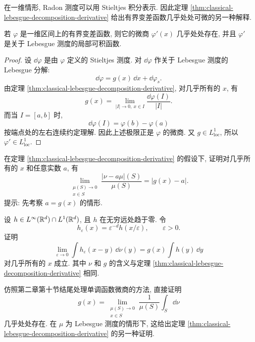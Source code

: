 在一维情形, Radon 测度可以用 Stieltjes 积分表示. 因此定理 \ref{thm:classical-lebesgue-decomposition-derivative} 给出有界变差函数几乎处处可微的另一种解释.

\begin{thm}\label{thm:bv-function-ae-derivative-from-decomposition}
	若 \(\varphi\) 是一维区间上的有界变差函数, 则它的微商 \(\varphi'(x)\) 几乎处处存在, 并且 \(\varphi'\) 是关于 Lebesgue 测度的局部可积函数.
\end{thm}

\begin{proof}
	设 \(\dd\varphi\) 是由 \(\varphi\) 定义的 Stieltjes 测度. 对 \(\dd\varphi\) 作关于 Lebesgue 测度的 Lebesgue 分解:
	\[
	\dd\varphi=g(x)\,\dd x+\dd\varphi_s.
	\]
	由定理 \ref{thm:classical-lebesgue-decomposition-derivative}, 对几乎所有的 \(x\), 有
	\[
	g(x)=
	\lim_{|I|\to0,\ x\in I}
	\frac{\dd\varphi(I)}{|I|}.
	\]
	而当 \(I=[a,b]\) 时,
	\[
	\dd\varphi(I)=\varphi(b)-\varphi(a)
	\]
	按端点处的左右连续约定理解. 因此上述极限正是 \(\varphi\) 的微商. 又 \(g\in L^1_{\operatorname{loc}}\), 所以 \(\varphi'\in L^1_{\operatorname{loc}}\).
\end{proof}

\begin{exer}\label{exer:classical-decomposition-total-variation-derivative}
	在定理 \ref{thm:classical-lebesgue-decomposition-derivative} 的假设下, 证明对几乎所有的 \(x\) 和任意实数 \(a\), 有
	\[
	\lim_{\substack{\mu(S)\to0\\x\in S}}
	\frac{|\nu-a\mu|(S)}{\mu(S)}
	=
	|g(x)-a|.
	\]
	提示: 先考察 \(a=g(x)\) 的情形.
\end{exer}

\begin{exer}\label{exer:approximate-identity-measure-density}
	设 \(h\in L^\infty(\mathbb{R}^d)\cap L^1(\mathbb{R}^d)\), 且 \(h\) 在无穷远处趋于零. 令
	\[
	h_\varepsilon(x)=\varepsilon^{-d}h(x/\varepsilon),
	\qquad \varepsilon>0.
	\]
	证明
	\[
	\lim_{\varepsilon\to0}
	\int h_\varepsilon(x-y)\,\dd\nu(y)
	=
	g(x)\int h(y)\,\dd y
	\]
	对几乎所有的 \(x\) 成立. 其中 \(\nu\) 和 \(g\) 的含义与定理 \ref{thm:classical-lebesgue-decomposition-derivative} 相同.
\end{exer}

\begin{exer}\label{exer:direct-proof-density-of-measure}
	仿照第二章第十节结尾处理单调函数微商的方法, 直接证明
	\[
	g(x)=
	\lim_{\substack{\mu(S)\to0\\x\in S}}
	\frac{1}{\mu(S)}\int_S\dd\nu
	\]
	几乎处处存在. 在 \(\mu\) 为 Lebesgue 测度的情形下, 这给出定理 \ref{thm:classical-lebesgue-decomposition-derivative} 的另一种证明.
\end{exer}

